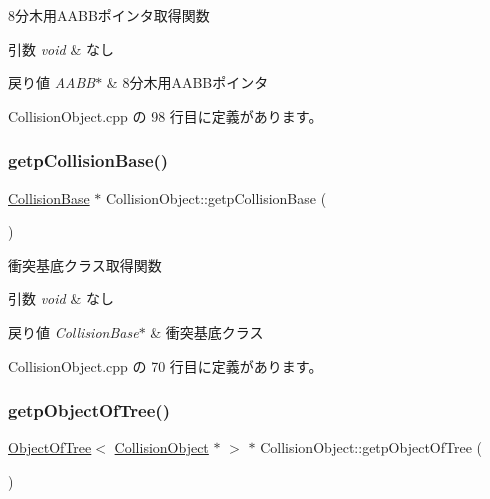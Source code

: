 8分木用\+A\+A\+B\+Bポインタ取得関数 


\begin{DoxyParams}{引数}
{\em void} & なし \\
\hline
\end{DoxyParams}

\begin{DoxyRetVals}{戻り値}
{\em A\+A\+B\+B$\ast$} & 8分木用\+A\+A\+B\+Bポインタ \\
\hline
\end{DoxyRetVals}


 Collision\+Object.\+cpp の 98 行目に定義があります。

\mbox{\label{class_collision_object_abefc470a5608429eb208d46ba097f01e}} 
\subsubsection{\texorpdfstring{getp\+Collision\+Base()}{getpCollisionBase()}}
{\footnotesize\ttfamily \mbox{\hyperlink{class_collision_base}{Collision\+Base}} $\ast$ Collision\+Object\+::getp\+Collision\+Base (\begin{DoxyParamCaption}{ }\end{DoxyParamCaption})}



衝突基底クラス取得関数 


\begin{DoxyParams}{引数}
{\em void} & なし \\
\hline
\end{DoxyParams}

\begin{DoxyRetVals}{戻り値}
{\em Collision\+Base$\ast$} & 衝突基底クラス \\
\hline
\end{DoxyRetVals}


 Collision\+Object.\+cpp の 70 行目に定義があります。

\mbox{\label{class_collision_object_a37388d7bcb131af17fe31be8394d1c10}} 
\subsubsection{\texorpdfstring{getp\+Object\+Of\+Tree()}{getpObjectOfTree()}}
{\footnotesize\ttfamily \mbox{\hyperlink{class_object_of_tree}{Object\+Of\+Tree}}$<$ \mbox{\hyperlink{class_collision_object}{Collision\+Object}} $\ast$ $>$ $\ast$ Collision\+Object\+::getp\+Object\+Of\+Tree (\begin{DoxyParamCaption}{ }\end{DoxyParamCaption})}



